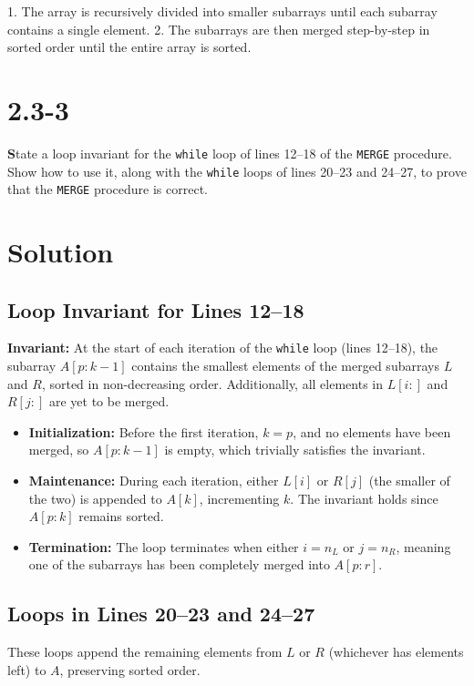 \documentclass{article}
\begin{document}
1. The array is recursively divided into smaller subarrays until each subarray contains a single element.
2. The subarrays are then merged step-by-step in sorted order until the entire array is sorted.

\section*{2.3-3}

\textbf State a loop invariant for the \texttt{while} loop of lines 12–18 of the \texttt{MERGE} procedure. Show how to use it, along with the \texttt{while} loops of lines 20–23 and 24–27, to prove that the \texttt{MERGE} procedure is correct.

\section*{Solution}

\subsection*{Loop Invariant for Lines 12–18}

\textbf{Invariant:} At the start of each iteration of the \texttt{while} loop (lines 12–18), the subarray $A[p:k-1]$ contains the smallest elements of the merged subarrays $L$ and $R$, sorted in non-decreasing order. Additionally, all elements in $L[i:]$ and $R[j:]$ are yet to be merged.

\begin{itemize}
    \item \textbf{Initialization:} Before the first iteration, $k = p$, and no elements have been merged, so $A[p:k-1]$ is empty, which trivially satisfies the invariant.
    \item \textbf{Maintenance:} During each iteration, either $L[i]$ or $R[j]$ (the smaller of the two) is appended to $A[k]$, incrementing $k$. The invariant holds since $A[p:k]$ remains sorted.
    \item \textbf{Termination:} The loop terminates when either $i = n_L$ or $j = n_R$, meaning one of the subarrays has been completely merged into $A[p:r]$.
\end{itemize}

\subsection*{Loops in Lines 20–23 and 24–27}

These loops append the remaining elements from $L$ or $R$ (whichever has elements left) to $A$, preserving sorted order.
\end{document}
